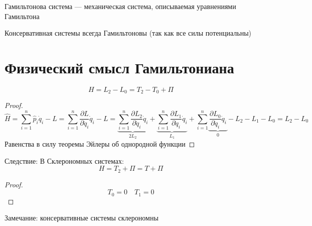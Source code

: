 \documentclass[crop=false]{standalone}
\begin{document}
\Def Гамильтонова система — механическая система, описываемая уравнениями Гамильтона

\noindent \keypoint Консервативная системы всегда Гамильтоновы (так как все силы потенциальны)
\section{Физический смысл Гамильтониана}
\noindent \keypoint
\[H = L_2 - L_0 = T_2 - T_0 + \Pi\]
\begin{proof}
    \[\hat H = \sum_{i=1}^{n} \hat p_i \dot q_i - L = \sum_{i=1}^{n} \frac{\partial L}{\partial \dot q_i} \dot q_i - L =  \underbrace{\sum_{i=1}^{n}\frac{\partial L_2}{\partial \dot q_i} \dot q_i}_{2 L_2} + \underbrace{\sum_{i=1}^{n} \frac{\partial L_1}{\partial \dot q_i} \dot q_i}_{L_1} + \sum_{i=1}^{n} \underbrace{\frac{\partial L_0}{\partial \dot q_i} \dot q_i}_0 - L_2 - L_1 - L_0 = L_2 - L_0\]
    Равенства в силу теоремы Эйлеры об однородной функции
\end{proof}
Следствие: В Склерономных системах:
\[H = T_2 + \Pi = T + \Pi\]
\begin{proof}
    \[T_0 = 0\quad T_1 = 0\]
\end{proof}
Замечание: консервативные системы склерономны 
\end{document}
